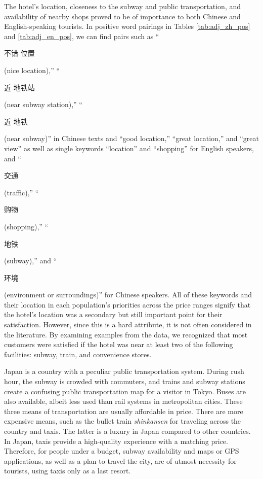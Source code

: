 \documentclass[smallextended,natbib]{svjour3}       %
\begin{document}
    The hotel's location, closeness to the subway and public transportation, and availability of nearby shops proved to be of importance to both Chinese and English-speaking tourists. In positive word pairings in Tables \ref{tab:adj_zh_pos} and \ref{tab:adj_en_pos}, we can find pairs such as ``\begin{CJK}{UTF8}{gbsn}不错 位置\end{CJK} (nice location),'' ``\begin{CJK}{UTF8}{gbsn}近 地铁站\end{CJK} (near subway station),'' ``\begin{CJK}{UTF8}{gbsn}近 地铁\end{CJK} (near subway)'' in Chinese texts and ``good location,'' ``great location,'' and ``great view'' as well as single keywords ``location'' and ``shopping'' for English speakers, and ``\begin{CJK}{UTF8}{gbsn}交通\end{CJK} (traffic),'' ``\begin{CJK}{UTF8}{gbsn}购物\end{CJK} (shopping),'' ``\begin{CJK}{UTF8}{gbsn}地铁\end{CJK} (subway),'' and ``\begin{CJK}{UTF8}{gbsn}环境\end{CJK} (environment or surroundings)'' for Chinese speakers. All of these keywords and their location in each population's priorities across the price ranges signify that the hotel's location was a secondary but still important point for their satisfaction. However, since this is a hard attribute, it is not often considered in the literature. By examining examples from the data, we recognized that most customers were satisfied if the hotel was near at least two of the following facilities: subway, train, and convenience stores. 

    Japan is a country with a peculiar public transportation system. During rush hour, the subway is crowded with commuters, and trains and subway stations create a confusing public transportation map for a visitor in Tokyo. Buses are also available, albeit less used than rail systems in metropolitan cities. These three means of transportation are usually affordable in price. There are more expensive means, such as the bullet train \textit{shinkansen} for traveling across the country and taxis. The latter is a luxury in Japan compared to other countries. In Japan, taxis provide a high-quality experience with a matching price. Therefore, for people under a budget, subway availability and maps or GPS applications, as well as a plan to travel the city, are of utmost necessity for tourists, using taxis only as a last resort. 
\end{document}
